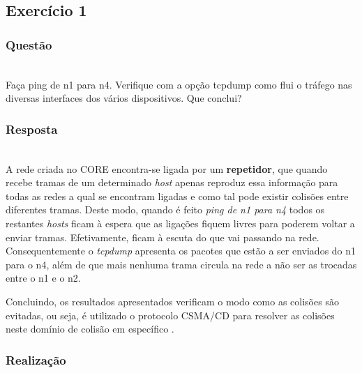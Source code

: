 \documentclass{llncs}
\begin{document}
\subsection{Exercício 1}
\subsubsection{Questão}\rule[-10pt]{0pt}{10pt}\\

Faça ping de n1 para n4. Verifique com a opção tcpdump como flui o tráfego nas diversas interfaces dos vários dispositivos. Que conclui?

\subsubsection{Resposta}\rule[-10pt]{0pt}{10pt}\\

A rede criada no CORE encontra-se ligada por um \textbf{repetidor}, que quando recebe tramas de um determinado \textit{host} apenas reproduz essa informação para todas as redes a qual se encontram ligadas e como tal pode existir colisões entre diferentes tramas. Deste modo, quando é feito \emph{ping de n1 para n4} todos os restantes \textit{hosts} ficam à espera que as ligações fiquem livres para poderem voltar a enviar tramas. Efetivamente, ficam à escuta do que vai passando na rede. Consequentemente o \textit{tcpdump} apresenta os pacotes que estão a ser enviados do n1 para o n4, além de que mais nenhuma trama circula na rede a não ser as trocadas entre o n1 e o n2.

Concluindo, os resultados apresentados verificam o modo como as colisões são evitadas, ou seja, é utilizado o protocolo CSMA/CD para resolver as colisões neste domínio de colisão em específico \cite{wiki:csma}.

\subsubsection{Realização}\rule[-10pt]{0pt}{10pt}\\
\end{document}
